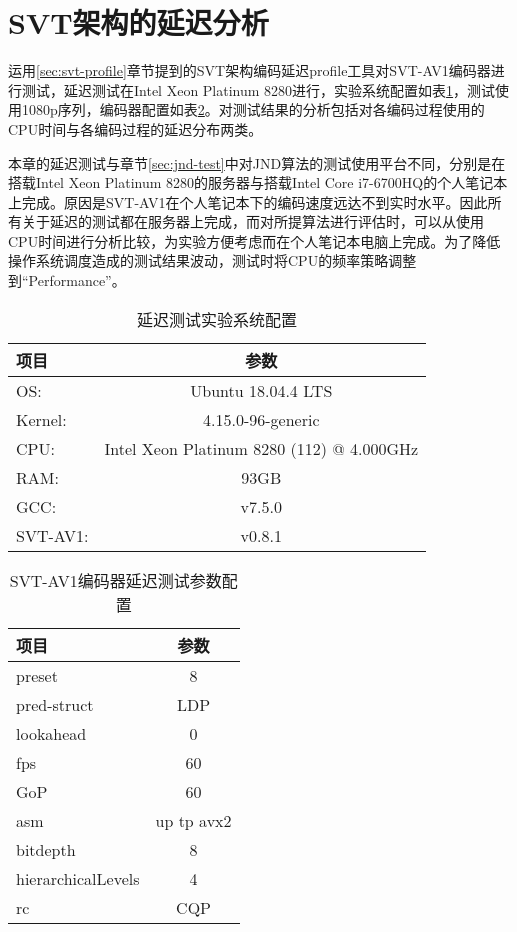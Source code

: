 \section{SVT架构的延迟分析}
运用\ref{sec:svt-profile}章节提到的SVT架构编码延迟profile工具对SVT-AV1编码器进行测试，延迟测试在Intel Xeon Platinum 8280进行，实验系统配置如表\ref{tab:os-8280}，测试使用1080p序列，编码器配置如表\ref{tab:svt-lat}。对测试结果的分析包括对各编码过程使用的CPU时间与各编码过程的延迟分布两类。

本章的延迟测试与章节\ref{sec:jnd-test}中对JND算法的测试使用平台不同，分别是在搭载Intel Xeon Platinum 8280的服务器与搭载Intel Core i7-6700HQ的个人笔记本上完成。原因是SVT-AV1在个人笔记本下的编码速度远达不到实时水平。因此所有关于延迟的测试都在服务器上完成，而对所提算法进行评估时，可以从使用CPU时间进行分析比较，为实验方便考虑而在个人笔记本电脑上完成。为了降低操作系统调度造成的测试结果波动，测试时将CPU的频率策略调整到“Performance”。

\begin{table}[!hpt]
	\renewcommand{\arraystretch}{0.9}
	\caption{延迟测试实验系统配置}
	\label{tab:os-8280}
	\centering
	\begin{tabular}{lc} \toprule
		项目& 参数  \\ \midrule
		OS:     &Ubuntu 18.04.4 LTS\\
		Kernel: & 4.15.0-96-generic\\
		CPU:    &Intel Xeon Platinum 8280 (112) @ 4.000GHz\\
		RAM:    &93GB\\
		GCC:    &v7.5.0\\
		SVT-AV1: & v0.8.1\\ \bottomrule
	\end{tabular}
\end{table}

\begin{table}[!hpt]
	\renewcommand{\arraystretch}{0.9}
	\caption{SVT-AV1编码器延迟测试参数配置}
	\label{tab:svt-lat}
	\centering
	\begin{tabular}{lc} \toprule
		项目& 参数  \\ \midrule
		preset     &8\\
		pred-struct& LDP\\
		lookahead    &0\\
		fps    &60\\
		GoP    &60\\
		asm    & up tp avx2\\
		bitdepth & 8\\
		hierarchicalLevels  & 4 \\
		rc & CQP\\ \bottomrule
	\end{tabular}
\end{table}

